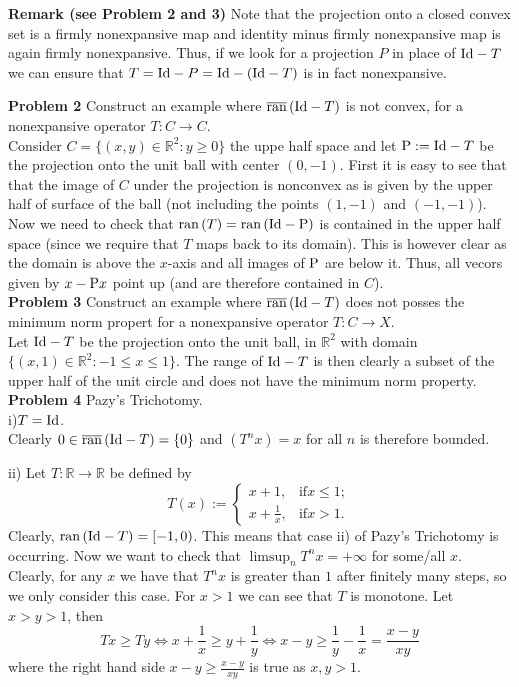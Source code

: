 \documentclass{scrartcl}
\newcommand{\R}{\mathbb{R}}
\theoremstyle{plain}
\theoremstyle{remark}
\newcommand{\Id}{\textup{Id}}
\renewcommand{\P}{\textup{P}}
\newcommand{\ran}{\textup{ran}\,}
\newcommand{\clran}{\overline{\textup{ran}}\,}
\begin{document}
\textbf{Remark (see Problem 2 and 3)} 
Note that the projection onto a closed convex set is a firmly nonexpansive map and identity minus firmly nonexpansive map is again firmly nonexpansive.
Thus, if we look for a projection $P$ in place of $\Id - T$ we can ensure that $T = \Id - P = \Id - (\Id - T)$ is in fact nonexpansive.

\textbf{Problem 2} Construct an example where $\clran(\Id - T)$ is not convex, for a nonexpansive operator $T:C \to C$.\\
Consider $C= \{(x,y) \in \R^2 : y \ge 0 \}$ the uppe half space and let $\P := \Id - T$ be the projection onto the unit ball with center $(0,-1)$.
First it is easy to see that that the image of $C$ under the projection is nonconvex as is given by the upper half of surface of the ball (not including the points $(1,-1)$ and $(-1,-1)$).
Now we need to check that $\ran(T) = \ran (\Id - \P)$ is contained in the upper half space (since we require that $T$ maps back to its domain).
This is however clear as the domain is above the $x$-axis and all images of $\P$ are below it. Thus, all vecors given by $x - \P x$ point up (and are therefore contained in $C$). \\

\textbf{Problem 3} Construct an example where $\clran(\Id - T)$ does not posses the minimum norm propert for a nonexpansive operator $T:C \to X$. \\
Let $\Id - T$ be the projection onto the unit ball, in $\R^2$ with domain $\{(x, 1) \in \R^2 : -1 \le x\le 1\}$.
The range of $\Id - T$ is then clearly a subset of the upper half of the unit circle and does not have the minimum norm property. \\


\textbf{Problem 4} Pazy's Trichotomy.\\
i)$T=\Id$.\\
Clearly $0 \in \clran(\Id - T) = \{0\}$ and $(T^{n}x) = x$ for all $n$ is therefore bounded.

ii) Let $T: \R \to \R$  be defined by
\begin{equation}
  T(x) := 
  \begin{cases}
    x+1, & \text{if} x\le1; \\
    x+\frac{1}{x}, & \text{if} x > 1.
  \end{cases}
\end{equation}
Clearly, $\ran(\Id - T) = [-1, 0)$.
This means that case ii) of Pazy's Trichotomy is occurring. 
Now we want to check that $\limsup_n T^n x = +\infty$ for some/all $x$. \\
Clearly, for any $x$ we have that $T^n x$ is greater than $1$ after finitely many steps, so we only consider this case.
For $x>1$ we can see that $T$ is monotone. Let $x>y > 1$, then
\begin{equation}
  Tx \ge Ty \Leftrightarrow x + \frac{1}{x} \ge y + \frac{1}{y} \Leftrightarrow x-y \ge \frac{1}{y} - \frac{1}{x} = \frac{x-y}{xy}
\end{equation}
where the right hand side $x-y \ge \frac{x-y}{xy}$ is true as $x,y > 1$.
\end{document}
